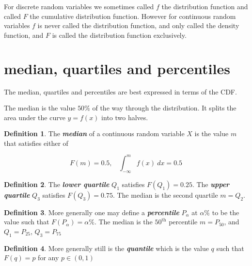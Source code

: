 \documentclass[
]{book}
\theoremstyle{definition}
\newtheorem{definition}{Definition}[chapter]
\theoremstyle{definition}
\theoremstyle{definition}
\theoremstyle{definition}
\theoremstyle{remark}
\begin{document}
For discrete random variables we sometimes called \(f\) the distribution function and called \(F\) the cumulative distribution function. However for continuous random variables \(f\) is never called the distribution function, and only called the density function, and \(F\) is called the distribution function exclusively.

\hypertarget{median-quartiles-and-percentiles}{%
\section{median, quartiles and percentiles}\label{median-quartiles-and-percentiles}}

The median, quartiles and percentiles are best expressed in terms of the CDF.

The median is the value \(50\%\) of the way through the distribution. It splits the area under the curve \(y=f(x)\) into two halves.

\begin{definition}
The \textbf{\emph{median}} of a continuous random variable \(X\) is the value \(m\) that satisfies either of

\[F(m) = 0.5 , \ \ \ \ \int_{-\infty}^{m}f(x) \ dx = 0.5\]
\end{definition}

\begin{definition}
The \textbf{\emph{lower quartile}} \(Q_1\) satisfies \(F(Q_1) = 0.25\).
The \textbf{\emph{upper quartile}} \(Q_3\) satisfies \(F(Q_3) = 0.75\).
The median is the second quartile \(m=Q_2\).
\end{definition}

\begin{definition}
More generally one may define a \textbf{\emph{percentile}} \(P_{\alpha}\) at \(\alpha \%\) to be the value such that \(F(P_{\alpha})= \alpha \%\). The median is the \(50^{\text{th}}\) percentile \(m = P_{50}\), and \(Q_1 = P_{25}\), \(Q_3 = P_{75}\)
\end{definition}

\begin{definition}
More generally still is the \textbf{\emph{quantile}} which is the value \(q\) such that \(F(q)=p\) for any \(p\in(0,1)\)
\end{definition}
\end{document}
